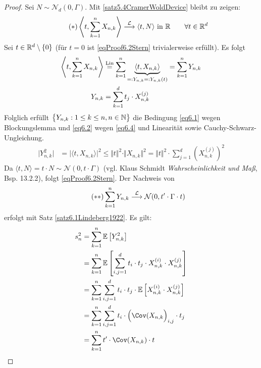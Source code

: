 \begin{proof}
Sei $N\sim\mathcal{N}_d(0,\Gamma)$. Mit \ref{satz5.4CramerWoldDevice} bleibt zu zeigen:
\begin{align}
\label{eqProof6.2Stern}\tag{$\ast$}
\left\langle t,\sum\limits_{k=1}^n X_{n,k}\right\rangle\stackrel{\mathcal{L}}{\longrightarrow}\langle t,N\rangle\text{ in }\mathbb{R}\qquad\forall t\in\mathbb{R}^d
\end{align}
Sei $t\in\mathbb{R}^d\setminus\lbrace0\rbrace$ (für $t=0$ ist \eqref{eqProof6.2Stern} trivialerweise erfüllt). Es folgt
\begin{align*}
\left\langle t,\sum\limits_{k=1}^n X_{n,k}\right\rangle
&\stackrel{\text{Lin}}{=}
\sum\limits_{k=1}^n\underbrace{\left\langle t,X_{n,k}\right\rangle}_{=:Y_{n,k}=:Y_{n,k}(t)}
=\sum\limits_{k=1}^n Y_{n,k}\\
Y_{n,k}
&=\sum\limits_{k=1}^d t_j\cdot X_{n,k}^{(j)}
\end{align*}
Folglich erfüllt $\big\lbrace Y_{n,k}:1\leq k\leq n,n\in\mathbb{N}\big\rbrace$ die Bedingung \eqref{eq6.1} wegen Blockungslemma und \eqref{eq6.2} wegen \eqref{eq6.4} und Linearität sowie Cauchy-Schwarz-Ungleichung.
\begin{align*}
\big|Y_{n,k}^2\big|&=\big|\langle t,X_{n,k}\rangle\big|^2
\leq\Vert t\Vert^2\cdot\Vert X_{n,k}\Vert^2
=\Vert t\Vert^2\cdot\sum\limits_{j=1}^d\left(X_{n,k}^{(j)}\right)^2
\end{align*}
Da $\langle t,N\rangle=t\cdot N\sim\mathcal{N}(0,t\cdot\Gamma)$ (vgl. Klaus Schmidt \textit{Wahrscheinlichkeit und Maß}, Bsp. 13.2.2), folgt \eqref{eqProof6.2Stern}. Der Nachweis von 
\begin{align}\label{eqProof6.2SternStern}\tag{$\ast\ast$}
\sum\limits_{k=1}^n Y_{n,k}\stackrel{\mathcal{L}}{\longrightarrow}\mathcal{N}(0,t'\cdot\Gamma\cdot t)
\end{align}
erfolgt mit Satz \ref{satz6.1Lindeberg1922}. Es gilt:
\begin{align*}
s_n^2
&=\sum\limits_{k=1}^n\E\left[Y_{n,k}^2\right]\\
&=\sum\limits_{k=1}^n\E\left[\sum\limits_{i,j=1}^d t_i\cdot t_j\cdot X_{n,k}^{(i)}\cdot X_{n,k}^{(j)}\right]\\
&=\sum\limits_{k=1}^n\sum\limits_{i,j=1}^d t_i\cdot t_j\cdot\E\left[X_{n,k}^{(i)}\cdot X_{n,k}^{(j)}\right]\\
&=\sum\limits_{k=1}^n\sum\limits_{i,j=1}^d t_i\cdot\Big(\Cov(X_{n,k}\Big)_{i,j}\cdot t_j\\
&=\sum\limits_{k=1}^n t'\cdot\Cov(X_{n,k})\cdot t\\

\end{align*}
\end{proof}
